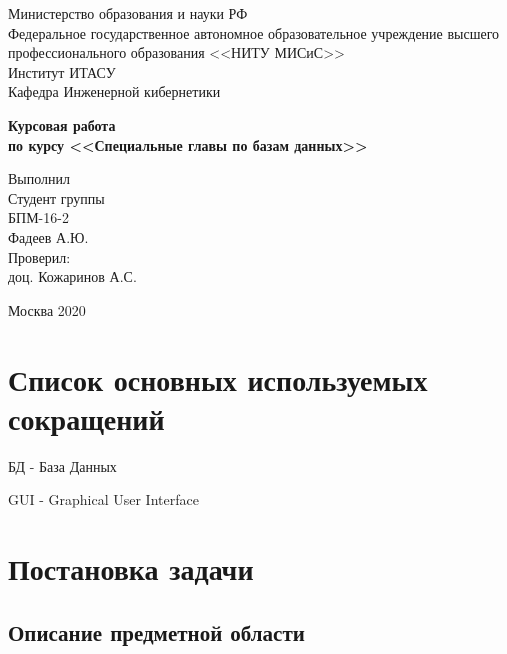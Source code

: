 \documentclass[a4paper,12pt,preview]{report} %
\begin{document}
	
	\begin{center}
		Министерство образования и науки РФ \\
		Федеральное государственное автономное образовательное учреждение высшего профессионального образования <<НИТУ МИСиС>>\\
		Институт ИТАСУ\\
		Кафедра Инженерной кибернетики\\
	\end{center}
	
	
	\vfill
	
	\begin{center}
		\Large\textbf{Курсовая работа \\
			по курсу <<Специальные главы по базам данных>>}
	\end{center}
	
	\vfill
	
	\begin{FlushRight}
		Выполнил\\
		Студент группы \\
		БПМ-16-2 \\
		Фадеев А.Ю. \\
		[\baselineskip]
		Проверил: \\
		доц. Кожаринов А.С. \\
		[9\baselineskip]
	\end{FlushRight}
	
	
	\begin{center}
		Москва 2020
	\end{center}
	
	\thispagestyle{empty}
	\newpage
	
	\tableofcontents
	
	\newpage
	
	
	
	\chapter{Список основных используемых сокращений}
	
	БД - База Данных
	
	GUI - Graphical User Interface
	
	
	\chapter{Постановка задачи}
	
	\section{Описание предметной области}
	
\end{document}
